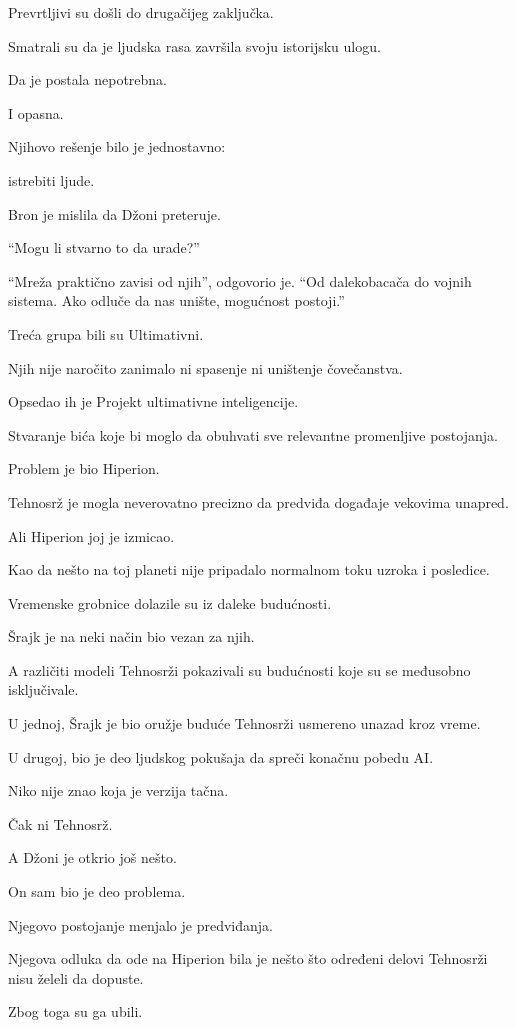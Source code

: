 Prevrtljivi su došli do drugačijeg zaključka.

Smatrali su da je ljudska rasa završila svoju istorijsku ulogu.

Da je postala nepotrebna.

I opasna.

Njihovo rešenje bilo je jednostavno:

istrebiti ljude.

Bron je mislila da Džoni preteruje.

``Mogu li stvarno to da urade?''

``Mreža praktično zavisi od njih'', odgovorio je. ``Od dalekobacača do vojnih sistema. Ako odluče da nas unište, mogućnost postoji.''

Treća grupa bili su Ultimativni.

Njih nije naročito zanimalo ni spasenje ni uništenje čovečanstva.

Opsedao ih je Projekt ultimativne inteligencije.

Stvaranje bića koje bi moglo da obuhvati sve relevantne promenljive postojanja.

Problem je bio Hiperion.

Tehnosrž je mogla neverovatno precizno da predviđa događaje vekovima unapred.

Ali Hiperion joj je izmicao.

Kao da nešto na toj planeti nije pripadalo normalnom toku uzroka i posledice.

Vremenske grobnice dolazile su iz daleke budućnosti.

Šrajk je na neki način bio vezan za njih.

A različiti modeli Tehnosrži pokazivali su budućnosti koje su se međusobno isključivale.

U jednoj, Šrajk je bio oružje buduće Tehnosrži usmereno unazad kroz vreme.

U drugoj, bio je deo ljudskog pokušaja da spreči konačnu pobedu AI.

Niko nije znao koja je verzija tačna.

Čak ni Tehnosrž.

A Džoni je otkrio još nešto.

On sam bio je deo problema.

Njegovo postojanje menjalo je predviđanja.

Njegova odluka da ode na Hiperion bila je nešto što određeni delovi Tehnosrži nisu želeli da dopuste.

Zbog toga su ga ubili.

